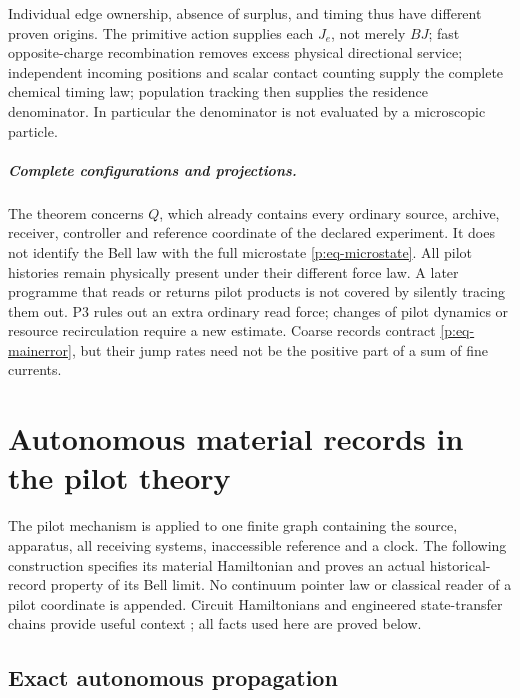 \documentclass[11pt,oneside,openany]{book}
\theoremstyle{definition}
\theoremstyle{remark}\newtheorem{remark}[theorem]{Remark}
\begin{document}
Individual edge ownership, absence of surplus, and timing thus have different proven origins. The primitive action supplies each $J_e$, not merely $BJ$; fast opposite-charge recombination removes excess physical directional service; independent incoming positions and scalar contact counting supply the complete chemical timing law; population tracking then supplies the residence denominator. In particular the denominator is not evaluated by a microscopic particle.

\paragraph{Complete configurations and projections.}
The theorem concerns $Q$, which already contains every ordinary source, archive, receiver, controller and reference coordinate of the declared experiment. It does not identify the Bell law with the full microstate \eqref{p:eq-microstate}. All pilot histories remain physically present under their different force law. A later programme that reads or returns pilot products is not covered by silently tracing them out. P3 rules out an extra ordinary read force; changes of pilot dynamics or resource recirculation require a new estimate. Coarse records contract \eqref{p:eq-mainerror}, but their jump rates need not be the positive part of a sum of fine currents.


\chapter{Autonomous material records in the pilot theory}\label{p:chapter-records}
\label{p:mat-section}

The pilot mechanism is applied to one finite graph containing the source,
apparatus, all receiving systems, inaccessible reference and a clock.  The
following construction specifies its material Hamiltonian and proves an
actual historical-record property of its Bell limit.  No continuum pointer
law or classical reader of a pilot coordinate is appended.  Circuit
Hamiltonians and engineered state-transfer chains provide useful context
\cite{pFeynman1986,pChristandl2004}; all facts used here are proved below.

\section{Exact autonomous propagation}
\end{document}
